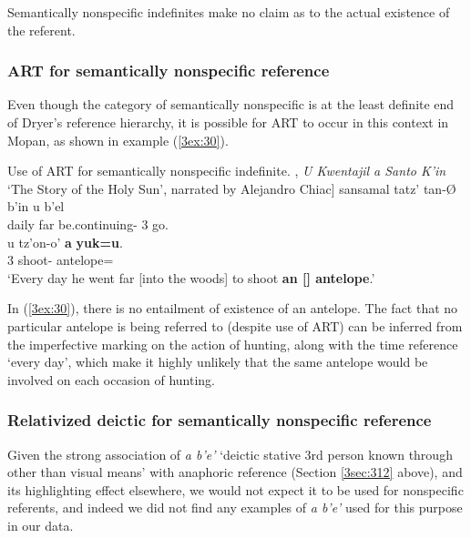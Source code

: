 \documentclass[output=paper]{langsci/langscibook}
\begin{document}
Semantically nonspecific indefinites make no claim as to the actual existence of the referent.  

\subsubsection{ART for semantically nonspecific reference}\label{3sec:351}

Even though the category of semantically nonspecific is at the least definite end of Dryer's reference hierarchy, it is possible for ART to occur in this context in Mopan, as shown in example (\ref{3ex:30}). 

\begin{exe}
\ex\label{3ex:30}
Use of ART for semantically nonspecific indefinite.  \newline
[\cite[][11]{verbeeck:99}, {\emph{U Kwentajil a Santo K'in}} `The Story of the Holy Sun', narrated by Alejandro Chiac]
\exi{}
\gll	sansamal	tatz'	tan-{\O}				b'in		u		b'el \\
	daily		far	be.continuing-{}	{}	3{}	go.{} \\
\glt
\exi{}
\gll	u		tz'on-o'			{\bf{a}}	{\bf{yuk=u}}. \\
	3{}	shoot-{}	{}	antelope={} \\
\glt	`Every day he went far [into the woods] to shoot {\bf{an [{}] antelope}}.'
\end{exe}

In (\ref{3ex:30}), there is no entailment of existence of an antelope.  The fact that no particular antelope is being referred to (despite use of ART) can be inferred from the imperfective marking on the action of hunting, along with the time reference `every day', which make it highly unlikely that the same antelope would be involved on each occasion of hunting.

\subsubsection{Relativized deictic for semantically nonspecific reference}\label{3sec:352}

Given the strong association of {\emph{a b'e'}} `deictic stative 3rd person known through other than visual means' with anaphoric reference (Section \ref{3sec:312} above), and its highlighting effect elsewhere, we would not expect it to be used for nonspecific referents, and indeed we did not find any examples of {\emph{a b'e'}} used for this purpose in our data.
\end{document}
